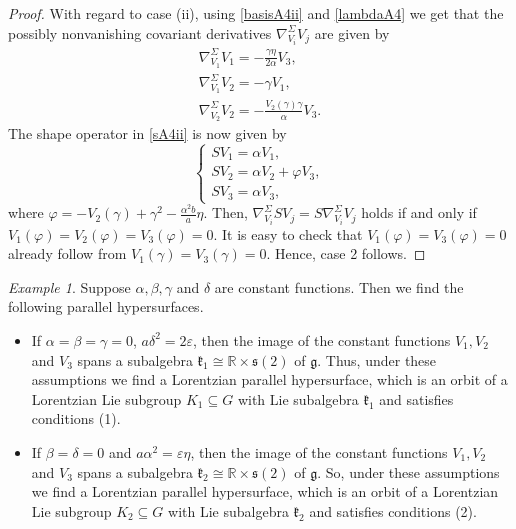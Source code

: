 \documentclass{amsart}
\theoremstyle{plain}
\theoremstyle{remark}
\newtheorem{example}{Example}
\newcommand\g{{\mathfrak{g}}}
\begin{document}
{\begin{proof}
With regard to case (ii), using \eqref{basisA4ii} and \eqref{lambdaA4} we get that the possibly nonvanishing covariant derivatives $\nabla^\Sigma _{V_i} V_j$ are given by
%
\[%
\begin{array}{l}
\nabla^\Sigma _{V_1} V_1 = -\frac{\gamma\eta}{2\alpha} V_3, \\[4 pt]
\nabla^\Sigma _{V_1} V_2 = -\gamma V_1, \\[4 pt]
\nabla^\Sigma _{V_2} V_2 = -\frac{V_2(\gamma)\gamma}{\alpha}V_3.
\end{array}
\]%
%
The shape operator in \eqref{sA4ii} is now given by
\[
\left\{
\begin{array}{l}
SV_1 =  \alpha V_1, \\[2 pt]
SV_2 =  \alpha V_2 + \varphi V_3, \\[2 pt]
SV_3 =  \alpha V_3,
\end{array}
\right.
\]
where $\varphi  = -V_2(\gamma) + \gamma^2-\frac{\alpha^2b}{a}\eta$. Then, $\nabla^{\Sigma} _{V_i}  SV_j=S \nabla^{\Sigma} _{V_i}  V_j$ holds if and only if 
$V_1(\varphi) = V_2(\varphi) = V_3(\varphi) = 0$.
It is easy to check that $V_1(\varphi) = V_3(\varphi) = 0$ already follow from $V_1(\gamma)=V_3(\gamma) = 0$. Hence, case 2 follows.
\end{proof}

\begin{example}
	Suppose $\alpha,\beta,\gamma$ and $\delta$ are constant functions. Then we find the following parallel hypersurfaces.
	\begin{itemize}
		\item If $\alpha =\beta =\gamma= 0$, $a\delta^2=2\varepsilon$, then the image of the constant functions $V_1,V_2$ and 
		$V_3$ spans a subalgebra $\mathfrak{k}_1 \cong \mathbb{R} \times \mathfrak{s}(2)$ of $\g$. Thus, under these assumptions we find a Lorentzian parallel hypersurface, which is an orbit of a Lorentzian Lie subgroup 
$K_1 \subseteq G$ with Lie subalgebra $\mathfrak{k}_1$ and satisfies conditions (1).
		\item If $\beta=\delta=0$ and $a\alpha^2=\varepsilon\eta$, then the image of the constant functions $V_1,V_2$ and $V_3$ spans a subalgebra $\mathfrak{k}_2 \cong \mathbb{R} \times \mathfrak{s}(2)$ of $\g$. So, under these assumptions we find a Lorentzian parallel hypersurface, which is an orbit of a Lorentzian Lie subgroup $K_2 \subseteq G$ with Lie subalgebra $\mathfrak{k}_2$ and satisfies conditions (2).
	\end{itemize}
\end{example}

}
\end{document}
